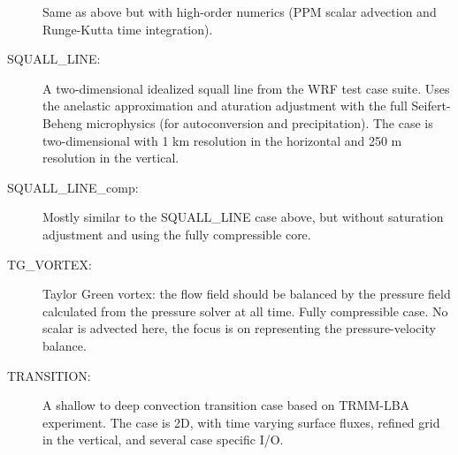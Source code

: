 \documentclass[12pt,A4,french]{article}
\begin{document}
\begin{description}
Same as above but with high-order numerics (PPM scalar advection and Runge-Kutta time integration).

\item[SQUALL\_LINE:]

A two-dimensional idealized squall line from the WRF test case suite. Uses the anelastic approximation and aturation adjustment with the full Seifert-Beheng microphysics (for autoconversion and precipitation). The case is two-dimensional with 1 km resolution in the horizontal and 250 m resolution in the vertical. 

\item[SQUALL\_LINE\_comp:]

Mostly similar to the SQUALL\_LINE case above, but without saturation adjustment and using the fully compressible core.

\item[TG\_VORTEX:]

Taylor Green vortex: the flow field should be balanced by the pressure field calculated from the pressure solver at all time. Fully compressible case. No scalar is advected here, the focus is on representing the pressure-velocity balance.

\item[TRANSITION:]

A shallow to deep convection transition case based on TRMM-LBA experiment. The case is 2D, with time varying surface fluxes, refined grid in the vertical, and several case specific I/O.
              
\end{description}


\clearpage


\end{document}
